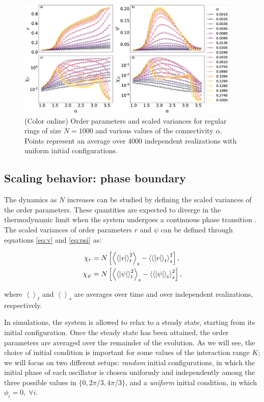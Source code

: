 \begin{figure}[t]
\begin{center}
    \includegraphics[width=0.95\textwidth]{fig/chi_curves_uniformic.eps}
    \caption{\label{fig:chicurves}
    (Color online) Order parameters and scaled variances for regular rings of
    size $N=1000$ and various values of the connectivity $\alpha$.  Points
    represent an average over 4000 independent realizations with uniform initial
    configurations.
    }
\end{center}
\end{figure}

\subsection{Scaling behavior: phase boundary}

The dynamics as $N$ increases can be studied by defining the scaled variances of the order parameters. These quantities are expected to
diverge in the thermodynamic limit when the system undergoes a continuous phase transition \cite{plischke1994equilibrium}.  The scaled
variances of order parameters $r$ and $\psi$ can be defined through equations \ref{eq:v} and \ref{eq:psi} as:

\begin{align}
    \chi_r &= N\left[ \left< \left< |v| \right>_t^2 \right>_s - \left< \left< |v| \right>_t \right>_s^2 \right] \notag , \\
    \chi_\psi &= N\left[ \left< \left< |\psi| \right>_t^2 \right>_s - \left< \left< |\psi| \right>_t \right>_s^2 \right],
\end{align}

\noindent where $\left<\right>_t$ and $\left<\right>_s$ are averages over time and over independent realizations, respectively.

In simulations, the system is allowed to relax to a steady state, starting from its initial configuration.  Once the steady state has
been attained, the order parameters are averaged over the remainder of the evolution. As we will see, the choice of initial condition
is important for some values of the interaction range $K$; we will focus on two different setups: \textit{random} initial
configurations, in which the initial phase of each oscillator is chosen uniformly and independently among the three possible values in
$\{ 0, 2\pi/3, 4\pi/3 \}$, and a \textit{uniform} initial condition, in which $\phi_i = 0, \; \forall i$.

